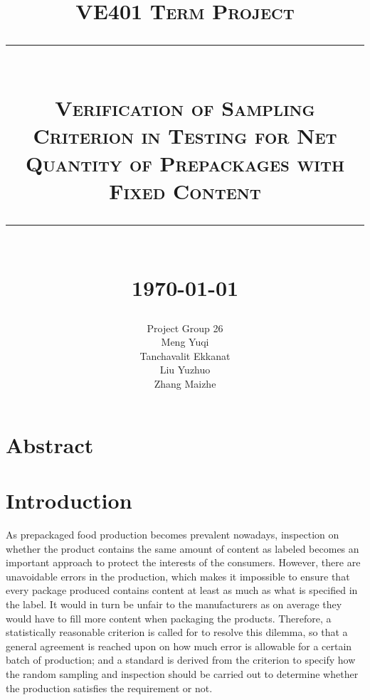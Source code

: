 \documentclass[12pt]{article}
\newcommand{\HRule}[1]{\rule{\linewidth}{#1}}
\begin{document}
\title{ \normalsize \textsc{VE401 Term Project}
		\\ [3.0cm]
		\HRule{0.5pt} \\ [0.5pt]
        \vspace*{\baselineskip}
		\LARGE \textbf{\textsc{Verification of Sampling Criterion in Testing for Net Quantity of Prepackages with Fixed Content}}
		\HRule{2pt} \\ [0.5cm]
        \vspace*{\baselineskip}
		\normalsize \today \vspace*{5\baselineskip}}

\date{}

\author{
		Project Group 26 \\ 
        \normalsize Meng Yuqi \\
		\normalsize Tanchavalit Ekkanat \\
        \normalsize Liu Yuzhuo \\ 
        \normalsize Zhang Maizhe}

\maketitle
\thispagestyle{empty}
\newpage
\thispagestyle{empty}

\tableofcontents
\newpage
{}

\section{Abstract}

\newpage

\section{Introduction}

As prepackaged food production becomes prevalent nowadays, inspection on whether the product contains the same amount of content as labeled becomes an important approach to protect the interests of the consumers. However, there are unavoidable errors in the production, which makes it impossible to ensure that every package produced contains content at least as much as what is specified in the label. It would in turn be unfair to the manufacturers as on average they would have to fill more content when packaging the products. Therefore, a statistically reasonable criterion is called for to resolve this dilemma, so that a general agreement is reached upon on how much error is allowable for a certain batch of production; and a standard is derived from the criterion to specify how the random sampling and inspection should be carried out to determine whether the production satisfies the requirement or not.
\end{document}
